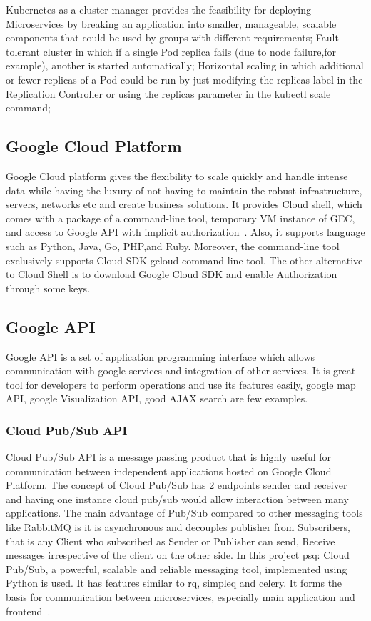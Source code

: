 Kubernetes as a cluster manager provides the feasibility for deploying
Microservices by breaking an application into smaller, manageable,
scalable components that could be used by groups with different
requirements; Fault-tolerant cluster in which if a single Pod replica
fails (due to node failure,for example), another is started
automatically; Horizontal scaling in which additional or fewer
replicas of a Pod could be run by just modifying the replicas label in
the Replication Controller or using the replicas parameter in the
kubectl scale command;

\subsection{Google Cloud Platform}

Google Cloud platform gives the flexibility to scale quickly and
handle intense data while having the luxury of not having to maintain
the robust infrastructure, servers, networks etc and create business
solutions. It provides Cloud shell, which comes with a package of a
command-line tool, temporary VM instance of GEC, and access to Google
API with implicit authorization~\cite{hid-sp18-602-cloud-shell}.
Also, it supports language such as Python, Java, Go, PHP,and Ruby.
Moreover, the command-line tool exclusively supports Cloud SDK gcloud
command line tool. The other alternative to Cloud Shell is to download
Google Cloud SDK and enable Authorization through some keys.

\subsection{Google API}

Google API is a set of application programming interface which allows
communication with google services and integration of other
services. It is great tool for developers to perform operations and
use its features easily, google map API, google Visualization API,
good AJAX search are few examples.


\subsubsection{Cloud Pub/Sub API}

Cloud Pub/Sub API is a message passing product that is highly useful
for communication between independent applications hosted on Google
Cloud Platform. The concept of Cloud Pub/Sub has 2 endpoints sender
and receiver and having one instance cloud pub/sub would allow
interaction between many applications. The main advantage of Pub/Sub
compared to other messaging tools like RabbitMQ is it is asynchronous
and decouples publisher from Subscribers, that is any Client who
subscribed as Sender or Publisher can send, Receive messages
irrespective of the client on the other side. In this project psq:
Cloud Pub/Sub, a powerful, scalable and reliable messaging tool,
implemented using Python is used. It has features similar to rq,
simpleq and celery. It forms the basis for communication between
microservices, especially main application and
frontend~\cite{hid-sp18-602-pub-sub}.

